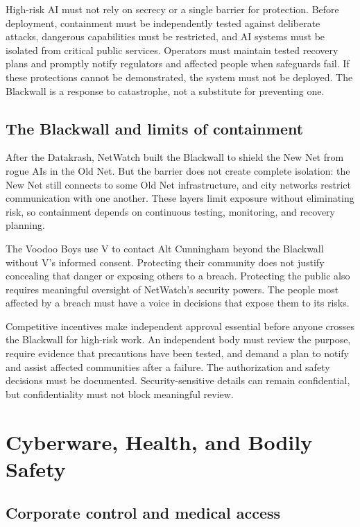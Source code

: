 \documentclass{article}%
\begin{document}
High-risk AI must not rely on secrecy or a single barrier for protection. Before deployment, containment must be independently tested against deliberate attacks, dangerous capabilities must be restricted, and AI systems must be isolated from critical public services. Operators must maintain tested recovery plans and promptly notify regulators and affected people when safeguards fail. If these protections cannot be demonstrated, the system must not be deployed. The Blackwall is a response to catastrophe, not a substitute for preventing one.

\subsection{The Blackwall and limits of containment}
After the Datakrash, NetWatch built the Blackwall to shield the New Net from rogue AIs in the Old Net. But the barrier does not create complete isolation: the New Net still connects to some Old Net infrastructure, and city networks restrict communication with one another. These layers limit exposure without eliminating risk, so containment depends on continuous testing, monitoring, and recovery planning.

The Voodoo Boys use V to contact Alt Cunningham beyond the Blackwall without V's informed consent. Protecting their community does not justify concealing that danger or exposing others to a breach. Protecting the public also requires meaningful oversight of NetWatch's security powers. The people most affected by a breach must have a voice in decisions that expose them to its risks.

Competitive incentives make independent approval essential before anyone crosses the Blackwall for high-risk work. An independent body must review the purpose, require evidence that precautions have been tested, and demand a plan to notify and assist affected communities after a failure. The authorization and safety decisions must be documented. Security-sensitive details can remain confidential, but confidentiality must not block meaningful review.

\section{Cyberware, Health, and Bodily Safety}
\subsection{Corporate control and medical access}
\end{document}
